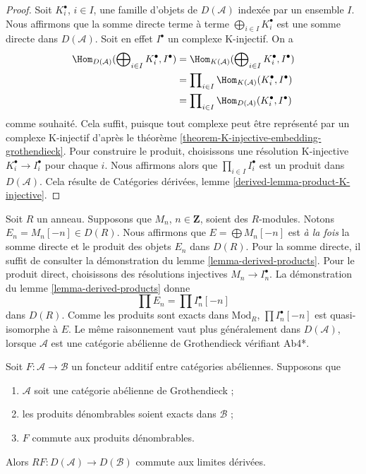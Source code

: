 \begin{proof}
Soit $K^\bullet_i$, $i \in I$, une famille d'objets de $D(\mathcal{A})$
indexée par un ensemble $I$. Nous affirmons que la somme directe terme à
terme $\bigoplus_{i \in I} K^\bullet_i$ est une somme directe dans
$D(\mathcal{A})$. Soit en effet $I^\bullet$ un complexe K-injectif. On a
\begin{align*}
\Hom_{D(\mathcal{A})}(\bigoplus\nolimits_{i \in I} K^\bullet_i, I^\bullet)
& =
\Hom_{K(\mathcal{A})}(\bigoplus\nolimits_{i \in I} K^\bullet_i, I^\bullet) \\
& =
\prod\nolimits_{i \in I} \Hom_{K(\mathcal{A})}(K^\bullet_i, I^\bullet) \\
& =
\prod\nolimits_{i \in I} \Hom_{D(\mathcal{A})}(K^\bullet_i, I^\bullet)
\end{align*}
comme souhaité. Cela suffit, puisque tout complexe peut être représenté par
un complexe K-injectif d'après le
théorème \ref{theorem-K-injective-embedding-grothendieck}.
Pour construire le produit, choisissons une résolution K-injective
$K_i^\bullet \to I_i^\bullet$ pour chaque $i$. Nous affirmons alors que
$\prod_{i \in I} I_i^\bullet$ est un produit dans $D(\mathcal{A})$.
Cela résulte de Catégories dérivées,
lemme \ref{derived-lemma-product-K-injective}.
\end{proof}

\begin{remark}
\label{remark-direct-sum-product-derived}
Soit $R$ un anneau. Supposons que $M_n$, $n \in \mathbf{Z}$, soient des
$R$-modules. Notons $E_n = M_n[-n] \in D(R)$. Nous affirmons que
$E = \bigoplus M_n[-n]$ est {\it à la fois} la somme directe et le produit des
objets $E_n$ dans $D(R)$. Pour la somme directe, il suffit de consulter la
démonstration du lemme \ref{lemma-derived-products}.
Pour le produit direct, choisissons des résolutions injectives
$M_n \to I_n^\bullet$. La démonstration du
lemme \ref{lemma-derived-products} donne
$$
\prod E_n = \prod I_n^\bullet[-n]
$$
dans $D(R)$. Comme les produits sont exacts dans $\text{Mod}_R$,
$\prod I_n^\bullet[-n]$ est quasi-isomorphe à $E$. Le même raisonnement vaut
plus généralement dans $D(\mathcal{A})$, lorsque $\mathcal{A}$ est une
catégorie abélienne de Grothendieck vérifiant Ab4*.
\end{remark}

\begin{lemma}
\label{lemma-RF-commutes-with-Rlim}
Soit $F : \mathcal{A} \to \mathcal{B}$ un foncteur additif entre catégories
abéliennes. Supposons que
\begin{enumerate}
\item $\mathcal{A}$ soit une catégorie abélienne de Grothendieck ;
\item les produits dénombrables soient exacts dans $\mathcal{B}$ ;
\item $F$ commute aux produits dénombrables.
\end{enumerate}
Alors $RF : D(\mathcal{A}) \to D(\mathcal{B})$ commute aux limites dérivées.
\end{lemma}

